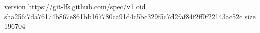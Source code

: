 version https://git-lfs.github.com/spec/v1
oid sha256:7da76174b867e861bb167780ca91d4c5bc329f5c7d2faf84f2ff0f22143ac52c
size 196704
